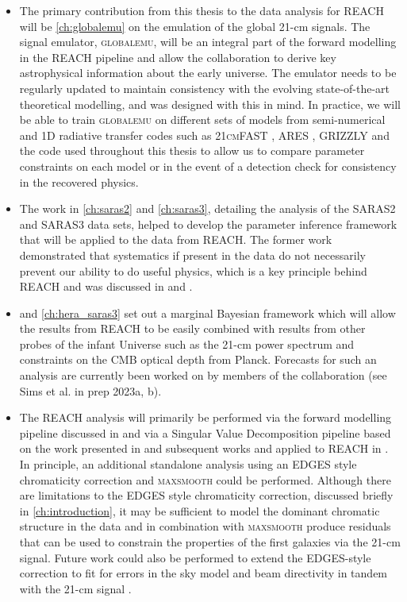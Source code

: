 \begin{itemize}
    \item The primary contribution from this thesis to the data analysis for REACH will be \cref{ch:globalemu} on the emulation of the global 21-cm signals. The signal emulator, \textsc{globalemu}, will be an integral part of the forward modelling in the REACH pipeline and allow the collaboration to derive key astrophysical information about the early universe. The emulator needs to be regularly updated to maintain consistency with the evolving state-of-the-art theoretical modelling, and was designed with this in mind. In practice, we will be able to train \textsc{globalemu} on different sets of models from semi-numerical and 1D radiative transfer codes such as \textsc{21cmFAST} \cite{Mesinger2011}, \textsc{ARES} \cite{ARES_sim}, \textsc{GRIZZLY} \cite{GharaGRIZZLYa,GharaGRIZZLYb} and the code used throughout this thesis to allow us to compare parameter constraints on each model or in the event of a detection check for consistency in the recovered physics.
    \item The work in \cref{ch:saras2} and \cref{ch:saras3}, detailing the analysis of the SARAS2 and SARAS3 data sets, helped to develop the parameter inference framework that will be applied to the data from REACH. The former work demonstrated that systematics if present in the data do not necessarily prevent our ability to do useful physics, which is a key principle behind REACH and was discussed in \cite{de_lera_acedo_reach_2022} and \cite{Scheutwinkel2022b}.
    \item {} and \cref{ch:hera_saras3} set out a marginal Bayesian framework which will allow the results from REACH to be easily combined with results from other probes of the infant Universe such as the 21-cm power spectrum and constraints on the CMB optical depth from Planck. Forecasts for such an analysis are currently been worked on by members of the collaboration (see Sims et al. in prep 2023a, b).
    \item The REACH analysis will primarily be performed via the forward modelling pipeline discussed in \cite{Anstey_REACH_2021, Anstey_antenna_2022, Anstey_lst_2022, Shen_ionosphere_2022, Scheutwinkel2022a, Scheutwinkel2022b} and via a Singular Value Decomposition pipeline based on the work presented in \cite{Tauscher2018} and subsequent works and applied to REACH in \cite{Saxena2022}. In principle, an additional standalone analysis using an EDGES style chromaticity correction and \textsc{maxsmooth} could be performed. Although there are limitations to the EDGES style chromaticity correction, discussed briefly in \cref{ch:introduction}, it may be sufficient to model the dominant chromatic structure in the data and in combination with \textsc{maxsmooth} produce residuals that can be used to constrain the properties of the first galaxies via the 21-cm signal. Future work could also be performed to extend the EDGES-style correction to fit for errors in the sky model and beam directivity in tandem with the 21-cm signal \citep[e.g.][]{Sims2022_beam}.
\end{itemize}

